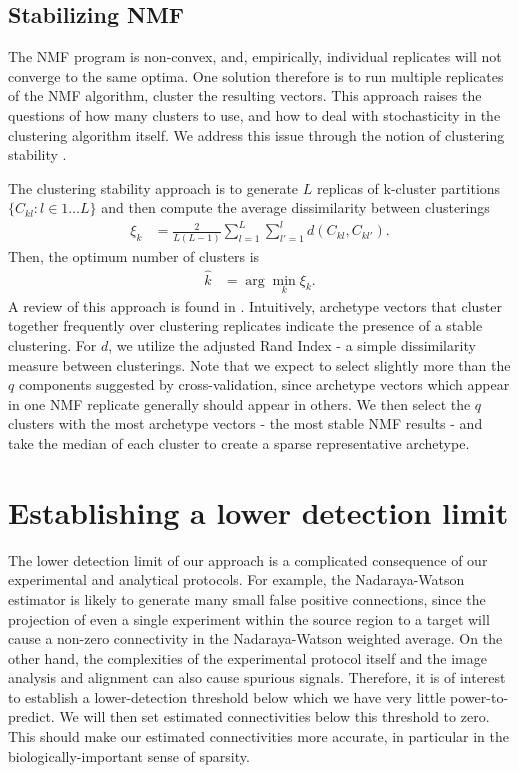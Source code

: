 \subsection{Stabilizing NMF}

The NMF program is non-convex, and, empirically, individual replicates will not converge to the same optima.
One solution therefore is to run multiple replicates of the NMF algorithm, cluster the resulting vectors.
This approach raises the questions of how many clusters to use, and how to deal with stochasticity in the clustering algorithm itself.
We address this issue through the notion of clustering stability \citep{Von_Luxburg2010-lu}.

The clustering stability approach is to generate $L$ replicas of k-cluster partitions $\{C_{kl} : l \in 1 \dots L\}$ and then compute the average dissimilarity between clusterings
\begin{align*}
\xi_k &= \frac{2}{L(L - 1)} \sum_{l = 1}^{L} \sum_{l'= 1}^{l}  d(C_{kl}, C_{kl'}).
\end{align*}
Then, the optimum number of clusters is 
\begin{align*}
\hat k &= \arg \min_k \xi_k.
\end{align*}
A review of this approach is found in \citet{Von_Luxburg2010-qe}.
Intuitively, archetype vectors that cluster together frequently over clustering replicates indicate the presence of a stable clustering.
For $d$, we utilize the adjusted Rand Index - a simple dissimilarity measure between clusterings.
Note that we expect to select slightly more than the $q$ components suggested by cross-validation, since archetype vectors which appear in one NMF replicate generally should appear in others.
We then select the $q$ clusters with the most archetype vectors - the most stable NMF results - and take the median of each cluster to create a sparse representative archetype.


\section{Establishing a lower detection limit}

The lower detection limit of our approach is a complicated consequence of our experimental and analytical protocols.
For example, the Nadaraya-Watson estimator is likely to generate many small false positive connections, since the projection of even a single experiment within the source region to a target will cause a non-zero connectivity in the Nadaraya-Watson weighted average.
On the other hand, the complexities of the experimental protocol itself and the image analysis and alignment can also cause spurious signals.
Therefore, it is of interest to establish a lower-detection threshold below which we have very little power-to-predict.
We will then set estimated connectivities below this threshold to zero.
This should make our estimated connectivities more accurate, in particular in the biologically-important sense of sparsity.

